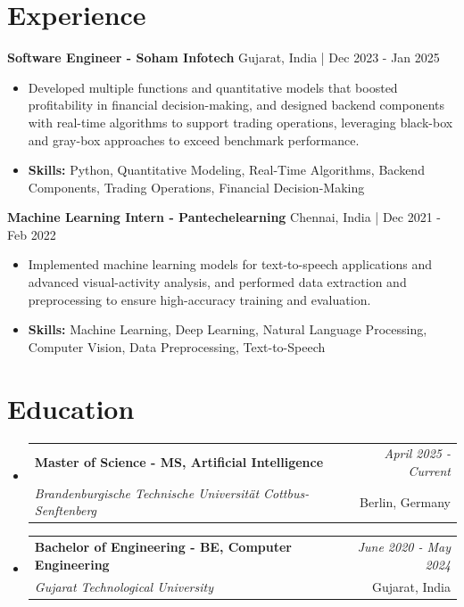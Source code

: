 \documentclass[a4paper,11pt]{article}
\makeatletter
\newcommand{\resumeSubheading}[4]{
\vspace{0.5mm}\item
    \begin{tabular*}{\linewidth}[t]{l@{\extracolsep{\fill}}r}
        \textbf{#1} & \textit{\footnotesize{#4}} \\
        \textit{\footnotesize{#3}} &  \footnotesize{#2}\\
    \end{tabular*}
    \vspace{-2.4mm}
}
\makeatother
\begin{document}
\section{\textbf{Experience}}


\vspace{1mm}
  \textbf{Software Engineer - Soham Infotech} \hfill Gujarat, India | Dec 2023 - Jan 2025
\vspace{-1.5mm} %
\begin{itemize}
  \item Developed multiple functions and quantitative models that boosted profitability in financial decision-making, and designed backend components with real-time algorithms to support trading operations, leveraging black-box and gray-box approaches to exceed benchmark performance.

\vspace{-2mm}
  \item \textbf{Skills:} Python, Quantitative Modeling, Real-Time Algorithms, Backend Components, Trading Operations, Financial Decision-Making
\end{itemize}

\vspace{1mm}
  \textbf{Machine Learning Intern - Pantechelearning} \hfill Chennai, India | Dec 2021 - Feb 2022
\vspace{-1.5mm} %
\begin{itemize}
  \item Implemented machine learning models for text-to-speech applications and advanced visual-activity analysis, and performed data extraction and preprocessing to ensure high-accuracy training and evaluation.
\vspace{-2mm}
  \item \textbf{Skills:} Machine Learning, Deep Learning, Natural Language Processing, Computer Vision, Data Preprocessing, Text-to-Speech
\end{itemize}\section{\textbf{Education}}
\vspace{-0.4mm}

\begin{itemize}[leftmargin=0.15in, label={}]
\resumeSubheading
{Master of Science - MS, Artificial Intelligence }{Berlin, Germany}
{Brandenburgische Technische Universität Cottbus-Senftenberg  }{April 2025 - Current}

\vspace{1.0mm} %
\resumeSubheading
{Bachelor of Engineering - BE, Computer Engineering  }{Gujarat, India}
{Gujarat Technological University }{June 2020 - May 2024}

\end{itemize}
\end{document}

